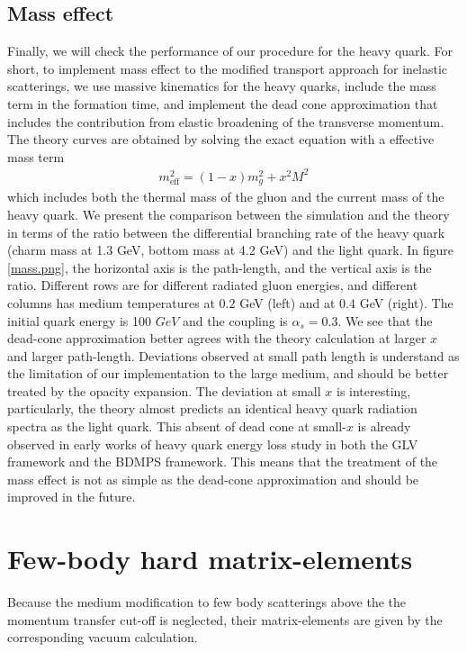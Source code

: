 \subsection{Mass effect}
Finally, we will check the performance of our procedure for the heavy quark.
For short, to implement mass effect to the modified transport approach for inelastic scatterings, we use massive kinematics for the heavy quarks, include the mass term in the formation time, and implement the dead cone approximation that includes the contribution from elastic broadening of the transverse momentum.
The theory curves are obtained by solving the exact equation with a effective mass term
\begin{eqnarray}
m_{\textrm{eff}}^2 = (1-x)m_g^2 + x^2 M^2
\end{eqnarray}
which includes both the thermal mass of the gluon and the current mass of the heavy quark.
We present the comparison between the simulation and the theory in terms of the ratio between the differential branching rate of the heavy quark (charm mass at 1.3 GeV, bottom mass at 4.2 GeV) and the light quark.
In figure \ref{mass.png}, the horizontal axis is the path-length, and the vertical axis is the ratio.
Different rows are for different radiated gluon energies, and different  columns has medium temperatures at $0.2$ GeV (left) and at $0.4$ GeV (right).
The initial quark energy is 100 $GeV$ and the coupling is $\alpha_s=0.3$.
We see that the dead-cone approximation better agrees with the theory calculation at larger $x$ and larger path-length.
Deviations observed at small path length is understand as the limitation of our implementation to the large medium, and should be better treated by the opacity expansion. 
The deviation at small $x$ is interesting, particularly, the theory almost predicts an identical heavy quark radiation spectra as the light quark. This absent of dead cone at small-$x$ is already observed in early works of heavy quark energy loss study in both the GLV framework and the BDMPS framework.
This means that the treatment of the mass effect is not as simple as the dead-cone approximation and should be improved in the future.

\section{Few-body hard matrix-elements}
\label{transport:ME}
Because the medium modification to few body scatterings above the the momentum transfer cut-off is neglected, their matrix-elements are given by the corresponding vacuum calculation.

